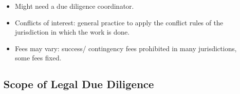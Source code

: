 \documentclass[
]{article}
\providecommand{\tightlist}{%
  \setlength{\itemsep}{0pt}\setlength{\parskip}{0pt}}
\begin{document}
\begin{itemize}
\tightlist
\item
  Might need a due diligence coordinator.
\item
  Conflicts of interest: general practice to apply the conflict rules of
  the jurisdiction in which the work is done.
\item
  Fees may vary: success/ contingency fees prohibited in many
  jurisdictions, some fees fixed.
\end{itemize}

\hypertarget{scope-of-legal-due-diligence}{%
\subsection{Scope of Legal Due
Diligence}\label{scope-of-legal-due-diligence}}
\end{document}
